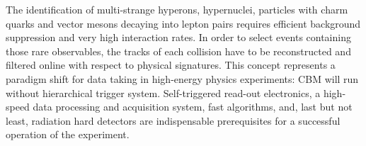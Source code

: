 
The identification of multi-strange hyperons, hypernuclei, particles with charm quarks and vector mesons decaying into lepton pairs requires efficient background suppression and very high interaction rates. In order to select events containing those rare observables, the tracks of each collision have to be reconstructed and filtered online with respect to physical signatures. This concept represents a paradigm shift for data taking in high-energy physics experiments: CBM will run without hierarchical trigger system. Self-triggered read-out electronics, a high-speed data processing and acquisition system, fast algorithms, and, last but not least, radiation hard detectors are indispensable prerequisites for a successful operation of the experiment.



%






